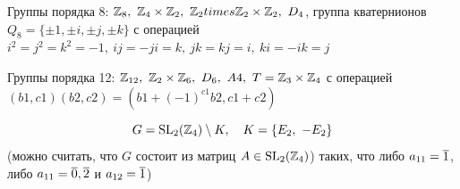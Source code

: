 \documentclass[11pt, fleqn]{article}
\begin{document}
    \begin{remark}[приложение]
        Группы порядка 8: $\mathbb{Z}_8,\ \mathbb{Z}_4 \times \mathbb{Z}_2,\ \mathbb{Z}_2 times \mathbb{Z}_2 \times \mathbb{Z}_2,\ D_4$, группа кватернионов $Q_8= \{\pm 1, \pm i, \pm j, \pm k\}$ с операцией $i^2 = j^2 = k^2 = -1,\ ij = -ji = k,\ jk = kj = i,\ ki = -ik = j$

        Группы порядка 12: $\mathbb{Z}_{12},\ \mathbb{Z}_2 \times \mathbb{Z}_6,\ D_6,\ A4,\ T = \mathbb{Z}_3 \times \mathbb{Z}_4$ с операцией $(b1, c1)(b2, c2) = (b1 + (-1)^{c1} b2, c1 + c2)$
    \end{remark}

    \begin{Remark}
        \[G = \mathop{\rm SL}\nolimits_2(\mathbb{Z}_4)\setminus K,\quad K = \{E_2,\ -E_2\}\]
        (можно считать, что $G$ состоит из матриц $A \in \mathop{\rm SL}\nolimits_2(\mathbb{Z}_4)$) таких, что либо $a_{11} = \overline{1}$, либо $a_{11} = \overline{0}, \overline{2}$ и $a_{12} = \overline{1}$)
    \end{Remark}
\end{document}
